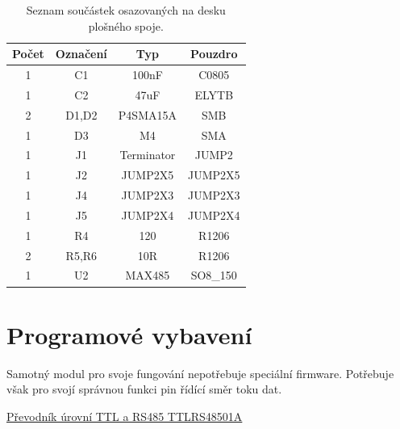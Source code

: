 \documentclass[12pt,a4paper,oneside]{article}
\begin{document}
\begin{savenotes}
\begin{table}[h!]
\begin{center}
\begin{tabular}{ |c|c|c|c| }
\hline 
Počet & Označení & Typ  & Pouzdro  \\ 
\hline 
1	&	C1	&	100nF	&	C0805	\\
1	&	C2	&	47uF	&	ELYTB	\\
2	&	D1,D2	&	P4SMA15A	&	SMB	\\
1	&	D3	&	M4	&	SMA	\\
1	&	J1	&	Terminator	&	JUMP2	\\
1	&	J2	&	JUMP2X5	&	JUMP2X5	\\
1	&	J4	&	JUMP2X3	&	JUMP2X3	\\
1	&	J5	&	JUMP2X4	&	JUMP2X4	\\
1	&	R4	&	120	&	R1206	\\
2	&	R5,R6	&	10R	&	R1206	\\
1	&	U2	&	MAX485	&	SO8\_150	\\
\hline 
\end{tabular}
\end{center}
\caption{Seznam součástek osazovaných na desku plošného spoje.}
\label{seznam_soucastek_galvanic_isolation}
\end{table}
\end{savenotes}



\section{Programové vybavení}

Samotný modul pro svoje  fungování nepotřebuje speciální firmware. Potřebuje však pro svojí správnou funkci pin řídící směr toku dat.  

\begin{thebibliography}{99}
\href{http://wiki.mlab.cz/doku.php?id=cs:ttlrs485}{Převodník úrovní TTL a RS485 TTLRS48501A}

\end{thebibliography}
\end{document}
